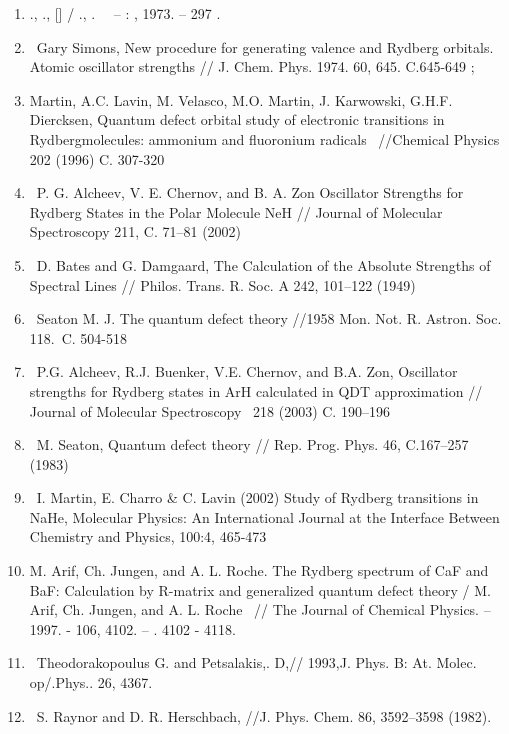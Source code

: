\documentclass[a4paper]{article}
\newcounter{saveenum}
\newcommand\liststyleWWNumi{%
\renewcommand\theenumi{\arabic{enumi}}
\renewcommand\theenumii{\Roman{enumii}}
\renewcommand\theenumiii{\roman{enumiii}}
\renewcommand\theenumiv{\arabic{enumiv}}
\renewcommand\labelenumi{\theenumi.}
\renewcommand\labelenumii{\theenumii.}
\renewcommand\labelenumiii{\theenumiii.}
\renewcommand\labelenumiv{\theenumiv.}
}
\begin{document}
\liststyleWWNumi
\setcounter{saveenum}{\value{enumi}}
\begin{enumerate}
\setcounter{enumi}{\value{saveenum}}
\item {\CYRB}{\cyre}{\cyrishrt}{\cyrt}{\cyrm}{\cyra}{\cyrn} {\CYRG}., {\CYREREV}{\cyrr}{\cyrd}{\cyre}{\cyrishrt}{\cyrn}
{\CYRA}., {\CYRV}{\cyrery}{\cyrs}{\cyrsh}{\cyri}{\cyre}
{\cyrt}{\cyrr}{\cyra}{\cyrn}{\cyrs}{\cyrc}{\cyre}{\cyrn}{\cyrd}{\cyre}{\cyrn}{\cyrt}{\cyrn}{\cyrery}{\cyre}
{\cyrf}{\cyru}{\cyrn}{\cyrk}{\cyrc}{\cyri}{\cyri} [{\CYRT}{\cyre}{\cyrk}{\cyrs}{\cyrt}] /
{\CYRB}{\cyre}{\cyrishrt}{\cyrt}{\cyrm}{\cyra}{\cyrn} {\CYRG}., {\CYREREV}{\cyrr}{\cyrd}{\cyre}{\cyrishrt}{\cyrn}
{\CYRA}. \ \ {}-- {\CYRM}{\cyro}{\cyrs}{\cyrk}{\cyrv}{\cyra}: {\CYRN}{\cyra}{\cyru}{\cyrk}{\cyra}, 1973. -- 297
{\cyrs}.
\item \foreignlanguage{english}{\ Gary Simons, New procedure for generating valence and Rydberg orbitals. Atomic
oscillator strengths // J. Chem. Phys. 1974. 60, 645. C.645-649 ;}
\item \foreignlanguage{english}{Martin, A.C. Lavin, M. Velasco, M.O. Martin, J. Karwowski, G.H.F. Diercksen, Quantum
defect orbital study of electronic transitions in Rydbergmolecules: ammonium and fluoronium radicals \ //Chemical
Physics 202 (1996) C. 307-320}
\item \foreignlanguage{english}{\ P. G. Alcheev, V. E. Chernov, and B. A. Zon Oscillator Strengths for Rydberg States in
the Polar Molecule NeH // Journal of Molecular Spectroscopy 211, C. 71--81 (2002)}
\item \foreignlanguage{english}{\ D. Bates and G. Damgaard, The Calculation of the Absolute Strengths of Spectral Lines
// Philos. Trans. R. Soc. A 242, 101--122 (1949)}
\item \foreignlanguage{english}{\ Seaton M. J. The quantum defect theory //1958 Mon. Not. R. Astron. Soc. 118.~C.
504-518}
\item \foreignlanguage{english}{\ P.G. Alcheev, R.J. Buenker, V.E. Chernov, and B.A. Zon, Oscillator strengths for
Rydberg states in ArH calculated in QDT approximation // Journal of Molecular Spectroscopy \ 218 (2003) C. 190--196}
\item \foreignlanguage{english}{\ M. Seaton, Quantum defect theory // Rep. Prog. Phys. 46, C.167--257 (1983)}
\item \foreignlanguage{english}{\ I. Martin, E. Charro \& C. Lavin (2002) Study of Rydberg transitions in NaHe,
Molecular Physics: An International Journal at the Interface Between Chemistry and Physics, 100:4, 465-473}
\item \foreignlanguage{english}{M. Arif, Ch. Jungen, and A. L. Roche. The Rydberg spectrum of CaF and BaF: Calculation
by R-matrix and generalized quantum defect theory / M. Arif, Ch. Jungen, and A. L. Roche \ // The Journal of Chemical
Physics. -- 1997. - 106, 4102. -- }{\CYRS}\foreignlanguage{english}{. 4102 - 4118.}
\item \foreignlanguage{english}{\ Theodorakopoulus G. and Petsalakis,. D,// 1993,J. Phys. B: At. Molec. op/.Phys.. 26,
4367.}
\item \foreignlanguage{english}{\ S. Raynor and D. R. Herschbach, //J. Phys. Chem. 86, 3592--3598 (1982).}
\end{enumerate}

\bigskip
\end{document}
